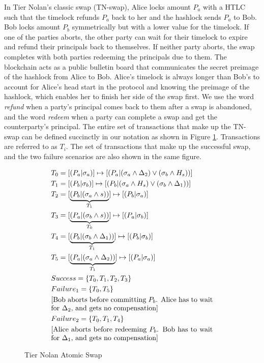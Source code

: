 In Tier Nolan's classic swap (TN-swap), Alice locks amount $P_a$ with a HTLC such that the timelock refunds $P_a$ back to her and the hashlock sends $P_a$ to Bob. Bob locks amount $P_b$ symmetrically but with a lower value for the timelock. If one of the parties aborts, the other party can wait for their timelock to expire and refund their principals back to themselves. If neither party aborts, the swap completes with both parties redeeming the principals due to them. The blockchain acts as a public bulletin board that communicates the secret preimage of the hashlock from Alice to Bob. Alice's timelock is always longer than Bob's to account for Alice's head start in the protocol and knowing the preimage of the hashlock, which enables her to finish her side of the swap first. We use the word \textit{refund} when a party's principal comes back to them after a swap is abandoned, and the word \textit{redeem} when a party can complete a swap and get the counterparty's principal. The entire set of transactions that make up the TN-swap can be defined succinctly in our notation as shown in Figure \ref{fig:tier_nolan_atomic_swap}. Transactions are referred to as $T_i$. The set of transactions that make up the successful swap, and the two failure scenarios are also shown in the same figure.

\begin{figure}[!htb!]
    \centering
    \caption{Tier Nolan Atomic Swap}
    \label{fig:tier_nolan_atomic_swap}
\begin{align*}
    &T_0 = [(P_a|\sigma_a)] \mapsto [(P_a|(\sigma_a \land \Delta_2) \lor (\sigma_b \land H_{s}))] \\
    &T_1 = [(P_b|\sigma_b)] \mapsto [(P_b|(\sigma_a \land H_{s}) \lor (\sigma_b \land \Delta_1))] \\
    &T_2 = [\underbrace{(P_b|(\sigma_a \land s))}_{T_1}] \mapsto [(P_b|\sigma_a)]\\
    &T_3 = [\underbrace{(P_a|(\sigma_b \land s))}_{T_0}] \mapsto [(P_a|\sigma_b)]\\
    &T_4 = [\underbrace{(P_b|(\sigma_b \land \Delta_1))}_{T_1}] \mapsto [(P_b|\sigma_b)] \\
    &T_5 = [\underbrace{(P_a|(\sigma_a \land \Delta_2))}_{T_1}] \mapsto [(P_a|\sigma_a)] \\
    &Success = \{T_0, T_1, T_2, T_3\} \\
    &Failure_1 = \{T_0, T_5\} \\
    &\text{\parbox{8cm}{[Bob aborts before committing $P_b$. Alice has to wait for $\Delta_2$, and gets no compensation]}} \\
    &Failure_2 = \{T_0, T_1, T_4\} \\
    &\text{\parbox{8cm}{[Alice aborts before redeeming $P_b$. Bob has to wait for $\Delta_1$, and gets no compensation]}}
\end{align*}
\end{figure}

